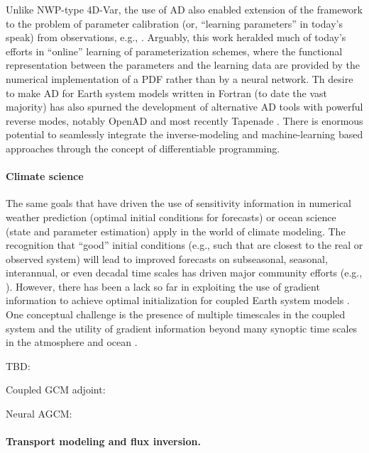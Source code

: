 Unlike NWP-type 4D-Var, the use of AD also enabled extension of the framework to the problem of parameter calibration (or, ``learning parameters'' in today's speak) from observations, e.g., \cite{Ferreira.2005,Stammer:2005dw,Liu:2012jd}. Arguably, this work heralded much of today's efforts in ``online'' learning of parameterization schemes, where the functional representation between the parameters and the learning data are provided by the numerical implementation of a PDF rather than by a neural network.
Th desire to make AD for Earth system models written in Fortran (to date the vast majority) has also spurned the development of alternative AD tools with powerful reverse modes, notably OpenAD \cite{Utke:2008ko} and most recently Tapenade \cite{Hascoet.2013,Gaikwad.2023,Gaikwad.2024}.
There is enormous potential to seamlessly integrate the inverse-modeling and machine-learning based approaches through the concept of differentiable programming.

\paragraph{Climate science}

The same goals that have driven the use of sensitivity information in numerical weather prediction (optimal initial conditions for forecasts) or ocean science (state and parameter estimation) apply in the world of climate modeling.
The recognition that ``good'' initial conditions (e.g., such that are closest to the real or observed system) will lead to improved forecasts on subseasonal, seasonal, interannual, or even decadal time scales has driven major community efforts (e.g., \cite{Meehl.2021}). However, there has been a lack so far in exploiting the use of gradient information to achieve optimal initialization for coupled Earth system models \cite{Frolov.2023}. 
One conceptual challenge is the presence of multiple timescales in the coupled system and the utility of gradient information beyond many synoptic time scales in the atmosphere and ocean \cite{Lea:2000gv,Lea:2002cv}.

TBD:

Coupled GCM adjoint:
\cite{Blessing.2014,Lyu.2018,Stammer:2018de}

Neural AGCM:
\cite{Kochkov.2023}

\paragraph{Transport modeling and flux inversion.}

